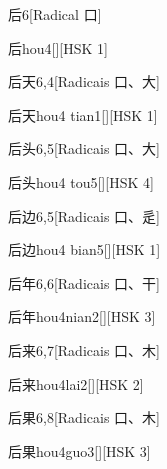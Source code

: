 \begin{entry}{后}{6}[Radical ⼝]
  \begin{phonetics}{后}{hou4}[][HSK 1]
  \end{phonetics}
\end{entry}

\begin{entry}{后天}{6,4}[Radicais ⼝、⼤]
  \begin{phonetics}{后天}{hou4 tian1}[][HSK 1]
  \end{phonetics}
\end{entry}

\begin{entry}{后头}{6,5}[Radicais ⼝、⼤]
  \begin{phonetics}{后头}{hou4 tou5}[][HSK 4]
  \end{phonetics}
\end{entry}

\begin{entry}{后边}{6,5}[Radicais ⼝、⾡]
  \begin{phonetics}{后边}{hou4 bian5}[][HSK 1]
  \end{phonetics}
\end{entry}

\begin{entry}{后年}{6,6}[Radicais ⼝、⼲]
  \begin{phonetics}{后年}{hou4nian2}[][HSK 3]
  \end{phonetics}
\end{entry}

\begin{entry}{后来}{6,7}[Radicais ⼝、⽊]
  \begin{phonetics}{后来}{hou4lai2}[][HSK 2]
  \end{phonetics}
\end{entry}

\begin{entry}{后果}{6,8}[Radicais ⼝、⽊]
  \begin{phonetics}{后果}{hou4guo3}[][HSK 3]
  \end{phonetics}
\end{entry}

